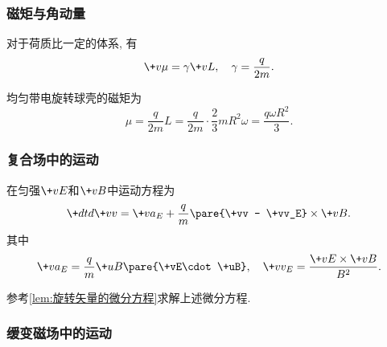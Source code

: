\documentclass[hidelinks]{ctexart}
\begin{document}

\subsubsection{磁矩与角动量} %
\label{ssub:磁矩与角动量}

\begin{finale}
    \begin{theorem}
        [磁旋比]
        对于荷质比一定的体系, 有
        \[ \+v\mu = \gamma \+vL,\quad \gamma = \frac{q}{2m}. \]
    \end{theorem}
\end{finale}
\begin{sample}
    \begin{ex}
        均匀带电旋转球壳的磁矩为
        \[ \mu = \frac{q}{2m}L = \frac{q}{2m}\cdot\frac{2}{3}mR^2\omega = \frac{q\omega R^2}{3}. \]
    \end{ex}
\end{sample}


\subsubsection{复合场中的运动} %
\label{ssub:复合场中的运动}

\begin{finale}
    \begin{theorem}[一般的匀强内的运动]
        在匀强$\+vE$和$\+vB$中运动方程为
        \[ \+dtd{\+vv} = \+va_E + \frac{q}{m}\pare{\+vv - \+vv_E}\times\+vB. \]
        其中
        \[ \+va_E = \frac{q}{m}\+uB\pare{\+vE\cdot\+uB},\quad \+vv_E = \frac{\+vE\times\+vB}{B^2}. \]
    \end{theorem}
\end{finale}
\begin{hardlink}
    参考\cref{lem:旋转矢量的微分方程}求解上述微分方程.
\end{hardlink}


\subsubsection{缓变磁场中的运动} %
\label{ssub:缓变磁场中的运动}
\end{document}
